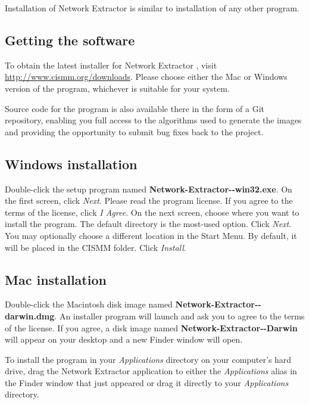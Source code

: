 \documentclass[11pt,titlepage,twoside]{article}
\begin{document}
Installation of Network Extractor \ProgramVersion is similar to installation of any other program.

\subsection{Getting the software}

To obtain the latest installer for Network Extractor \ProgramVersionNoSpace, visit \url{http://www.cismm.org/downloads}. Please choose either the Mac or Windows version of the program, whichever is suitable for your system.

Source code for the program is also available there in the form of a Git repository, enabling you full access to the algorithms used to generate the images and providing the opportunity to submit bug fixes back to the project. 

\subsection{Windows installation}

Double-click the setup program named \textbf{Network-Extractor-\ProgramVersionNoSpace-win32.exe}. On the first screen, click \emph{Next}. Please read the program license. If you agree to the terms of the license, click \emph{I Agree}. On the next screen, choose where you want to install the program. The default directory is the most-used option. Click \emph{Next}. You may optionally choose a different location in the Start Menu. By default, it will be placed in the CISMM folder. Click \emph{Install}.

\subsection{Mac installation}

Double-click the Macintosh disk image named \textbf{Network-Extractor-\ProgramVersionNoSpace-darwin.dmg}. An installer program will launch and ask you to agree to the terms of the license. If you agree, a disk image named \textbf{Network-Extractor-\ProgramVersionNoSpace-Darwin} will appear on your desktop and a new Finder window will open.

To install the program in your \emph{Applications} directory on your computer's hard drive, drag the Network Extractor \ProgramVersion application to either the \emph{Applications} alias in the Finder window that just appeared or drag it directly to your \emph{Applications} directory.
\end{document}
